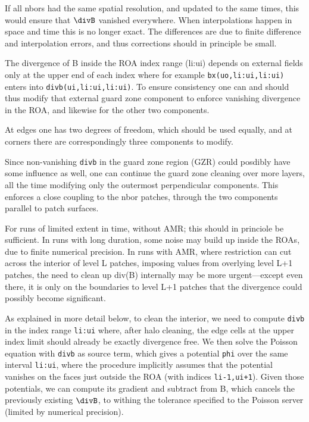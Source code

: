 \documentclass[paper=a4,fontsize=11pt]{scrartcl}
\numberwithin{equation}{section}		%
\numberwithin{figure}{section}			%
\numberwithin{table}{section}				%
\newcommand{\codecolor}{\color{Blue}}
\newcommand{\Code}[1]{{\codecolor\texttt{#1}}}
\begin{document}
If all nbors had the same spatial resolution, and updated to the same times, this would ensure that $\divB$ vanished everywhere.  When interpolations happen in space and time this is no longer exact.  The differences are due to finite difference and interpolation errors, and thus corrections should in principle be small.

The divergence of B inside the ROA index range (li:ui) depends on external fields only at the upper end of each index where for example \Code{bx(uo,li:ui,li:ui)} enters into \Code{divb(ui,li:ui,li:ui)}.  To ensure consistency one can and should thus modify that external guard zone component to enforce vanishing divergence in the ROA, and likewise for the other two components.  

At edges one has two degrees of freedom, which should be used equally, and at corners there are correspondingly three components to modify.

Since non-vanishing \Code{divb} in the guard zone region (GZR) could posdibly have some influence as well, one can continue the guard zone cleaning over more layers, all the time modifying only the outermost perpendicular components.  This enforces a close coupling to the nbor patches, through the two components parallel to patch surfaces.

For runs of limited extent in time, without AMR; this should in princiole be sufficient.  In runs with long duration, some noise may build up inside the ROAs, due to finite numerical precision.   In runs with AMR, where restriction can cut across the interior of level L patches, imposing values from overlying level L+1 patches, the need to clean up div(B) internally may be more urgent---except even there, it is only on the boundaries to level L+1 patches that the divergence could possibly become significant.

As explained in more detail below, to clean the interior, we need to compute \Code{divb} in the index range \Code{li:ui} where, after halo cleaning, the edge cells at the upper index limit should already be exactly divergence free.  We then solve the Poisson equation with \Code{divb} as source term, which gives a potential \Code{phi} over the same interval \Code{li:ui}, where the procedure implicitly assumes that the potential vanishes on the faces just outside the ROA (with indices \Code{li-1,ui+1}).  Given those potentials, we can compute its gradient and subtract from B, which cancels the previously existing $\divB$, to withing the tolerance specified to the Poisson server (limited by numerical precision).
\end{document}
